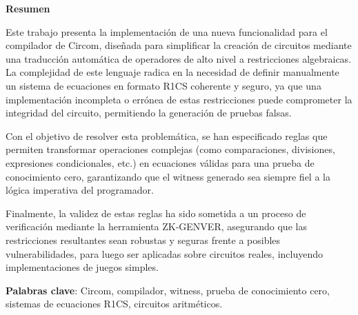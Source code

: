 \documentclass[a4paper,12pt]{report}
\newenvironment{resumen}{%
	\begin{center}
		\bfseries\Large Resumen
	\end{center}
	\vspace{0.5cm}
	\noindent 
}{
	\par\vspace{1cm}
}
\begin{document}
	\begin{resumen}
		Este trabajo presenta la implementación de una nueva funcionalidad para el compilador de Circom, diseñada para simplificar la creación de circuitos mediante una traducción automática de operadores de alto nivel a restricciones algebraicas. La complejidad de este lenguaje radica en la necesidad de definir manualmente un sistema de ecuaciones en formato R1CS coherente y seguro, ya que una implementación incompleta o errónea de estas restricciones puede comprometer la integridad del circuito, permitiendo la generación de pruebas falsas. 
		
		\vspace{0.2cm}
		\noindent
		Con el objetivo de resolver esta problemática, se han especificado reglas que permiten transformar operaciones complejas (como comparaciones, divisiones, expresiones condicionales, etc.) en ecuaciones válidas para una prueba de conocimiento cero, garantizando que el witness generado sea siempre fiel a la lógica imperativa del programador.
		
		
		\vspace{0.2cm}
		\noindent
		Finalmente, la validez de estas reglas ha sido sometida a un proceso de verificación mediante la herramienta ZK-GENVER, asegurando que las restricciones resultantes sean robustas y seguras frente a posibles vulnerabilidades, para luego ser aplicadas sobre circuitos reales, incluyendo implementaciones de juegos simples.
		
		\vspace{0.5cm}
		
		\noindent \textbf{Palabras clave}: Circom, compilador, witness, prueba de conocimiento cero, sistemas de ecuaciones R1CS, circuitos aritméticos.
	\end{resumen}
	
	
	
\end{document}
